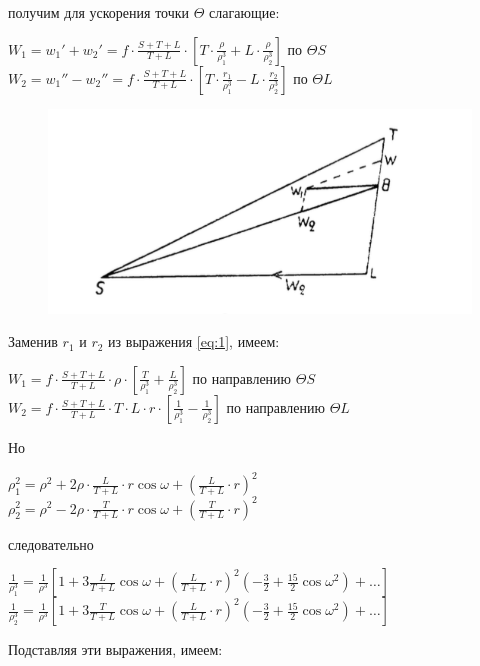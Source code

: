 \documentclass[a4paper,12pt]{article}
\begin{document}
получим для ускорения точки $\Theta$ слагающие:

\begin{center}
	$W_1 = w_1'+w_2'=f \cdot \frac{S+T+L}{T+L} \cdot \left[ T \cdot \frac{\rho}{\rho_1^3}+L \cdot \frac{\rho}{\rho_2^3}\right]$ по $\Theta S$ \\
	$W_2 = w_1''-w_2''=f \cdot \frac{S+T+L}{T+L} \cdot \left[ T \cdot \frac{r_1}{\rho_1^3}-L \cdot \frac{r_2}{\rho_2^3}\right]$ по $\Theta L$
\end{center}

\begin{figure}[bhtp]
	\caption{}
	\label{fg:23}
	\includegraphics{23.png}
\end{figure}

Заменив $r_1$ и $r_2$ из выражения \eqref{eq:1}, имеем:
\begin{center}
	$W_1 = f \cdot \frac{S+T+L}{T+L} \cdot \rho \cdot \left[ \frac{T}{\rho_1^3}+\frac{L}{\rho_2^3} \right]$ по направлению $\Theta S$ \\
	$W_2 = f \cdot \frac{S+T+L}{T+L} \cdot T \cdot L \cdot r \cdot \left[ \frac{1}{\rho_1^3}-\frac{1}{\rho_2^3} \right]$ по направлению $\Theta L$
\end{center}

Но

\begin{center}
	$\rho_1^2 = \rho^2 + 2 \rho \cdot \frac{L}{T+L}\cdot r \cos\omega+\left(\frac{L}{T+L}\cdot r \right)^2$ \\
		$\rho_2^2 = \rho^2 - 2 \rho \cdot \frac{T}{T+L}\cdot r \cos\omega+\left(\frac{T}{T+L}\cdot r \right)^2$
\end{center}
следовательно

\begin{center}
$\frac{1}{\rho_1^3}=\frac{1}{\rho^3} \left[ 1+3\frac{L}{T+L}\cos \omega+\left( \frac{L}{T+L} \cdot r\right)^2 \left(-\frac{3}{2}+\frac{15}{2}\cos\omega^2 \right) + \ldots \right]$ \\
$\frac{1}{\rho_2^3}=\frac{1}{\rho^3} \left[ 1+3\frac{T}{T+L}\cos \omega+\left( \frac{L}{T+L} \cdot r\right)^2 \left(-\frac{3}{2}+\frac{15}{2}\cos\omega^2 \right) + \ldots \right]$ 
\end{center}
Подставляя эти выражения, имеем:
\end{document}
